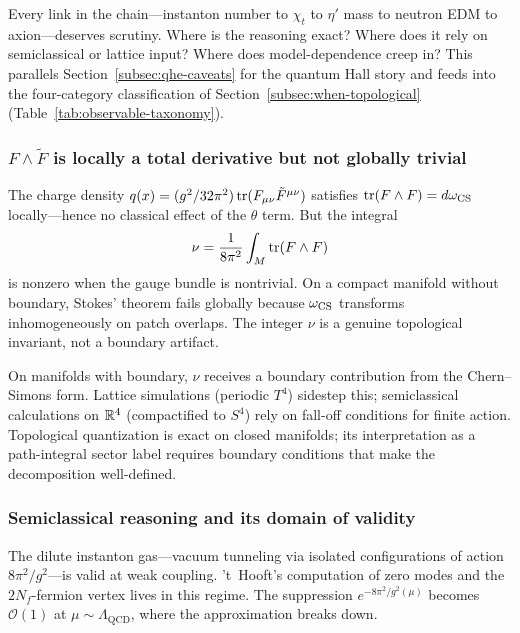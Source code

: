 Every link in the chain---instanton number to $\chi_t$ to $\eta'$ mass to neutron EDM to axion---deserves scrutiny.  Where is the reasoning exact?  Where does it rely on semiclassical or lattice input?  Where does model-dependence creep in?  This parallels Section~\ref{subsec:qhe-caveats} for the quantum Hall story and feeds into the four-category classification of Section~\ref{subsec:when-topological} (Table~\ref{tab:observable-taxonomy}).

\subsubsection{$F\wedge\tilde{F}$ is locally a total derivative but not globally trivial}

The charge density $q(x) = (g^2/32\pi^2)\operatorname{tr}(F_{\mu\nu}\tilde{F}^{\mu\nu})$ satisfies $\operatorname{tr}(F\wedge F) = d\omega_{\operatorname{CS}}$ locally---hence no classical effect of the $\theta$ term.  But the integral
\begin{equation}\label{eq:instanton-global}
  \nu = \frac{1}{8\pi^2}\int_M \operatorname{tr}(F\wedge F)
\end{equation}
is nonzero when the gauge bundle is nontrivial.  On a compact manifold without boundary, Stokes' theorem fails globally because $\omega_{\operatorname{CS}}$ transforms inhomogeneously on patch overlaps.  The integer $\nu$ is a genuine topological invariant, not a boundary artifact.

On manifolds with boundary, $\nu$ receives a boundary contribution from the Chern--Simons form.  Lattice simulations (periodic $T^4$) sidestep this; semiclassical calculations on $\mathbb{R}^4$ (compactified to $S^4$) rely on fall-off conditions for finite action.  Topological quantization is exact on closed manifolds; its interpretation as a path-integral sector label requires boundary conditions that make the decomposition well-defined.

\subsubsection{Semiclassical reasoning and its domain of validity}

The dilute instanton gas---vacuum tunneling via isolated configurations of action $8\pi^2/g^2$---is valid at weak coupling.  't~Hooft's computation of zero modes and the $2N_f$-fermion vertex \cite{tHooft1976BellJackiw,tHooft1976Pseudoparticle} lives in this regime.  The suppression $e^{-8\pi^2/g^2(\mu)}$ becomes $\mathcal{O}(1)$ at $\mu\sim\Lambda_{\mathrm{QCD}}$, where the approximation breaks down.

